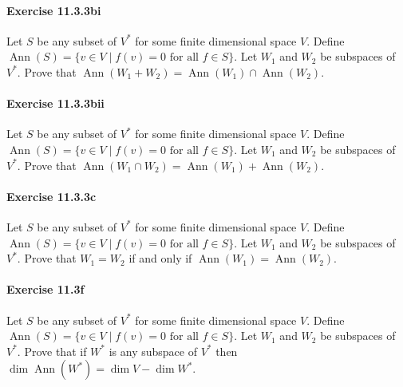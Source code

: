 \documentclass{article}
\begin{document}
\paragraph{Exercise 11.3.3bi} Let $S$ be any subset of $V^*$ for some finite dimensional space $V$. Define $\operatorname{Ann}(S)=\{v \in V \mid f(v)=0 \text{ for all } f \in S\}$. Let $W_1$ and $W_2$ be subspaces of $V^*$. Prove that $\operatorname{Ann}(W_1+W_2)=\operatorname{Ann}(W_1) \cap\operatorname{Ann}(W_2)$.

\paragraph{Exercise 11.3.3bii} Let $S$ be any subset of $V^*$ for some finite dimensional space $V$. Define $\operatorname{Ann}(S)=\{v \in V \mid f(v)=0 \text{ for all } f \in S\}$. Let $W_1$ and $W_2$ be subspaces of $V^*$. Prove that $\operatorname{Ann}(W_1\cap W_2)=\operatorname{Ann}(W_1) + \operatorname{Ann}(W_2)$.

\paragraph{Exercise 11.3.3c} Let $S$ be any subset of $V^*$ for some finite dimensional space $V$. Define $\operatorname{Ann}(S)=\{v \in V \mid f(v)=0 \text{ for all } f \in S\}$. Let $W_1$ and $W_2$ be subspaces of $V^*$. Prove that $W_1=W_2$ if and only if $\operatorname{Ann}(W_1)=\operatorname{Ann}(W_2)$.

\paragraph{Exercise 11.3f} Let $S$ be any subset of $V^*$ for some finite dimensional space $V$. Define $\operatorname{Ann}(S)=\{v \in V \mid f(v)=0 \text{ for all } f \in S\}$. Let $W_1$ and $W_2$ be subspaces of $V^*$. Prove that if $W^*$ is any subspace of $V^*$ then $\operatorname{dim} \operatorname{Ann}(W^*)=\operatorname{dim} V-\operatorname{dim} W^*$.
\end{document}
